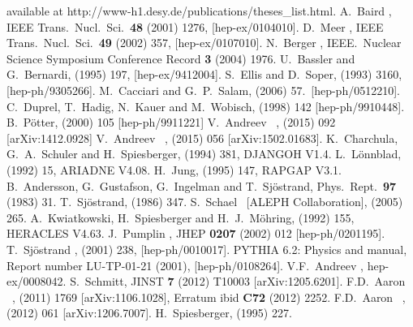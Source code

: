 \documentclass[12pt]{article}
\begin{document}
\begin{flushleft}
\begin{thebibliography}{99}
available at http://www-h1.desy.de/publications/theses\_list.html.
%
 A.~Baird \etal{}, IEEE Trans.~Nucl.~Sci.~{\bf 48} (2001) 1276, [hep-ex/0104010].
 D.~Meer \etal{}, IEEE Trans.~Nucl.~Sci.~{\bf 49} (2002) 357, [hep-ex/0107010].
 N.~Berger \etal{}, IEEE.~Nuclear Science Symposium Conference Record {\bf 3} (2004) 1976.
%
 U.~Bassler and G.~Bernardi,  (1995) 197, [hep-ex/9412004].
%
 S.~Ellis and D.~Soper,  (1993) 3160, [hep-ph/9305266].
%
 M.~Cacciari and G.~P.~Salam,  (2006) 57.~[hep-ph/0512210].
 C.~Duprel, T.~Hadig, N.~Kauer and M.~Wobisch,  (1998) 142 [hep-ph/9910448].
 B.~P\"otter,  (2000) 105 [hep-ph/9911221]
%
 V.~Andreev \etal\ \Hone,  (2015) 092 [arXiv:1412.0928]
 V.~Andreev \etal\ \Hone,  (2015) 056 [arXiv:1502.01683].
%
 K.~Charchula, G.~A.~Schuler and H.~Spiesberger,  (1994) 381,
DJANGOH V1.4.
%
 L.~L\"onnblad,  (1992)  15,  {ARIADNE V4.08}.
 H.~Jung,  (1995)  147, {RAPGAP V3.1}.
 B.~Andersson, G.~Gustafson, G.~Ingelman and T.~Sj\"ostrand, Phys.~Rept.~{\bf 97} (1983) 31.
 T.~Sj\"ostrand,  (1986) 347.
%
 S.~Schael \etal\ [ALEPH Collaboration],  (2005) 265.
 A.~Kwiatkowski, H.~Spiesberger and H.~J.~M\"ohring,  (1992) 155, {HERACLES V4.63}.
  J.~Pumplin \etal,
  JHEP {\bf 0207} (2002) 012
  [hep-ph/0201195].
  T.~Sj\"ostrand \etal,  (2001) 238, [hep-ph/0010017].
 PYTHIA 6.2: Physics and manual, Report number LU-TP-01-21 (2001), [hep-ph/0108264].
 V.F.~Andreev \etal, hep-ex/0008042.
%
 S.~Schmitt, JINST {\bf 7} (2012) T10003 [arXiv:1205.6201].
%
 F.D.~Aaron \etal\ \Hone,  (2011)
  1769 [arXiv:1106.1028], Erratum ibid {\bf C72} (2012) 2252.
 F.D.~Aaron \etal\ \Hone,  (2012) 061 [arXiv:1206.7007].
%
 H.~Spiesberger,  (1995) 227.

\end{thebibliography}
\end{flushleft}
\end{document}
